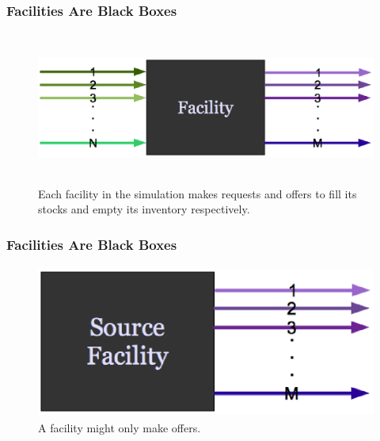 \begin{frame}[ctb!]
  \frametitle{Facilities Are Black Boxes}
  \begin{figure}[htbp!]
    \begin{center}
      \includegraphics[height=5cm]{./images/facility.eps}
    \end{center}
    \caption{ Each facility in the simulation makes requests and offers 
    to fill its stocks and empty its inventory respectively.  }
    \label{fig:facility}
  \end{figure}
\end{frame}
\begin{frame}[ctb!]
  \frametitle{Facilities Are Black Boxes}
  \begin{figure}[htbp!]
    \begin{center}
      \includegraphics[height=5cm]{./images/sourcefacility.eps}
    \end{center}
    \caption{ A facility might only make offers.} 
    \label{fig:sourcefacility}
  \end{figure}
\end{frame}
